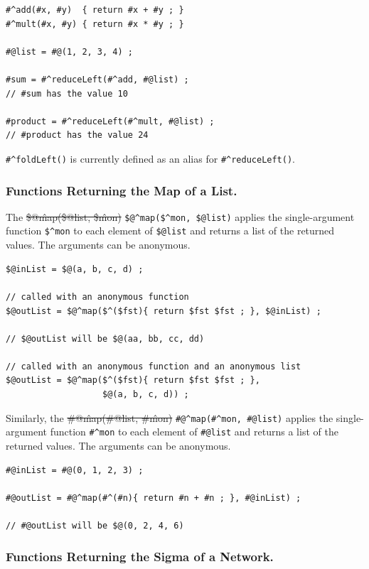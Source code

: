 \documentclass[letterpaper,12pt]{article}
\begin{document}
\begin{Verbatim}[fontsize=\small]
#^add(#x, #y)  { return #x + #y ; }
#^mult(#x, #y) { return #x * #y ; }

#@list = #@(1, 2, 3, 4) ;

#sum = #^reduceLeft(#^add, #@list) ;
// #sum has the value 10

#product = #^reduceLeft(#^mult, #@list) ;
// #product has the value 24
\end{Verbatim}

\noindent
\verb!#^foldLeft()! 
is currently defined as an alias for \verb!#^reduceLeft()!.

\subsubsection{Functions Returning the Map of a List.}

The \sout{\$@\^map(\$@list, \$\^mon)} \verb!$@^map($^mon, $@list)!
applies the single-argument function \verb!$^mon! to each element of
\verb!$@list! and returns a list of the returned values.  The arguments
can be anonymous.

\begin{Verbatim}[fontsize=\small]
$@inList = $@(a, b, c, d) ;

// called with an anonymous function
$@outList = $@^map($^($fst){ return $fst $fst ; }, $@inList) ;

// $@outList will be $@(aa, bb, cc, dd)

// called with an anonymous function and an anonymous list
$@outList = $@^map($^($fst){ return $fst $fst ; }, 
                   $@(a, b, c, d)) ;
\end{Verbatim}

Similarly, the \sout{\#@\^map(\#@list, \#\^mon)} 
\verb!#@^map(#^mon, #@list)!  applies the single-argument 
function \verb!#^mon! to each
element of \verb!#@list! and returns a list of the returned values.  The
arguments can be anonymous.

\begin{Verbatim}[fontsize=\small]
#@inList = #@(0, 1, 2, 3) ;

#@outList = #@^map(#^(#n){ return #n + #n ; }, #@inList) ;

// #@outList will be $@(0, 2, 4, 6)
\end{Verbatim}

\subsubsection{Functions Returning the Sigma of a Network.}
\end{document}
